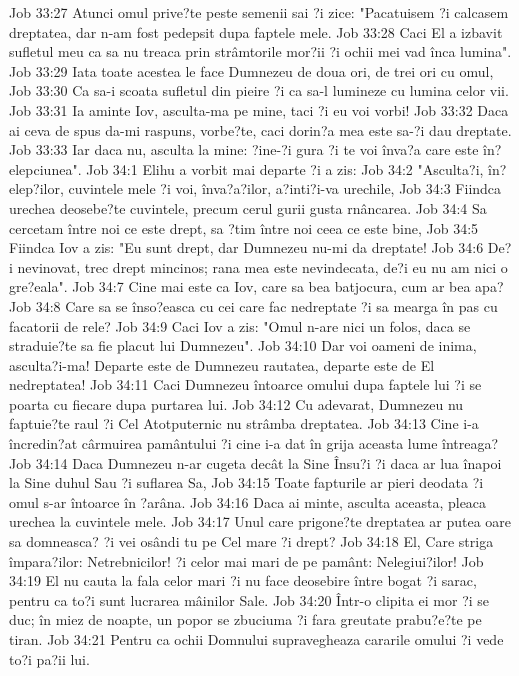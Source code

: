 Job 33:27  Atunci omul prive?te peste semenii sai ?i zice: "Pacatuisem ?i calcasem dreptatea, dar n-am fost pedepsit dupa faptele mele.
Job 33:28  Caci El a izbavit sufletul meu ca sa nu treaca prin strâmtorile mor?ii ?i ochii mei vad înca lumina".
Job 33:29  Iata toate acestea le face Dumnezeu de doua ori, de trei ori cu omul,
Job 33:30  Ca sa-i scoata sufletul din pieire ?i ca sa-l lumineze cu lumina celor vii.
Job 33:31  Ia aminte Iov, asculta-ma pe mine, taci ?i eu voi vorbi!
Job 33:32  Daca ai ceva de spus da-mi raspuns, vorbe?te, caci dorin?a mea este sa-?i dau dreptate.
Job 33:33  Iar daca nu, asculta la mine: ?ine-?i gura ?i te voi înva?a care este în?elepciunea".
Job 34:1  Elihu a vorbit mai departe ?i a zis:
Job 34:2  "Asculta?i, în?elep?ilor, cuvintele mele ?i voi, înva?a?ilor, a?inti?i-va urechile,
Job 34:3  Fiindca urechea deosebe?te cuvintele, precum cerul gurii gusta rnâncarea.
Job 34:4  Sa cercetam între noi ce este drept, sa ?tim între noi ceea ce este bine,
Job 34:5  Fiindca Iov a zis: "Eu sunt drept, dar Dumnezeu nu-mi da dreptate!
Job 34:6  De?i nevinovat, trec drept mincinos; rana mea este nevindecata, de?i eu nu am nici o gre?eala".
Job 34:7  Cine mai este ca Iov, care sa bea batjocura, cum ar bea apa?
Job 34:8  Care sa se înso?easca cu cei care fac nedreptate ?i sa mearga în pas cu facatorii de rele?
Job 34:9  Caci Iov a zis: "Omul n-are nici un folos, daca se straduie?te sa fie placut lui Dumnezeu".
Job 34:10  Dar voi oameni de inima, asculta?i-ma! Departe este de Dumnezeu rautatea, departe este de El nedreptatea!
Job 34:11  Caci Dumnezeu întoarce omului dupa faptele lui ?i se poarta cu fiecare dupa purtarea lui.
Job 34:12  Cu adevarat, Dumnezeu nu faptuie?te raul ?i Cel Atotputernic nu strâmba dreptatea.
Job 34:13  Cine i-a încredin?at cârmuirea pamântului ?i cine i-a dat în grija aceasta lume întreaga?
Job 34:14  Daca Dumnezeu n-ar cugeta decât la Sine Însu?i ?i daca ar lua înapoi la Sine duhul Sau ?i suflarea Sa,
Job 34:15  Toate fapturile ar pieri deodata ?i omul s-ar întoarce în ?arâna.
Job 34:16  Daca ai minte, asculta aceasta, pleaca urechea la cuvintele mele.
Job 34:17  Unul care prigone?te dreptatea ar putea oare sa domneasca? ?i vei osândi tu pe Cel mare ?i drept?
Job 34:18  El, Care striga împara?ilor: Netrebnicilor! ?i celor mai mari de pe pamânt: Nelegiui?ilor!
Job 34:19  El nu cauta la fala celor mari ?i nu face deosebire între bogat ?i sarac, pentru ca to?i sunt lucrarea mâinilor Sale.
Job 34:20  Într-o clipita ei mor ?i se duc; în miez de noapte, un popor se zbuciuma ?i fara greutate prabu?e?te pe tiran.
Job 34:21  Pentru ca ochii Domnului supravegheaza cararile omului ?i vede to?i pa?ii lui.
